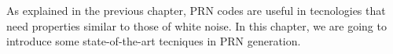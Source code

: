 As explained in the previous chapter, PRN codes are useful in tecnologies
that need properties similar to those of white noise. In this chapter, we
are going to introduce some state-of-the-art tecniques in PRN generation.





